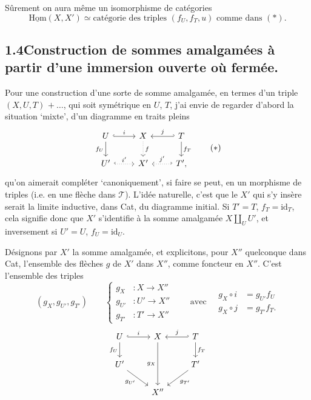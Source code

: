 \documentclass[11pt]{article}
\newcommand{\printedpage}[1]{\marginpar{\footnotesize p.~#1}}
\newcommand{\msp}[1]{\marginpar{\footnotesize [#1]}}
\newcommand{\uHom}{\underline{\mathrm{Hom}}}
\newcommand{\id}{\mathrm{id}}
\begin{document}
Sûrement on aura même un isomorphisme de catégories
\[
\uHom(X,X') \simeq \text{catégorie des triples } (f_U,f_T,u) \text{ comme dans } (*).
\]

\subsection*{1.4\quad Construction de sommes amalgamées à partir d'une immersion ouverte où fermée.} %

Pour une construction d'une sorte de somme amalgamée, en termes d'un triple $(X,U,T)$ $+\ \ldots$, \msp{page 67} qui soit symétrique en $U$, $T$, j'ai envie de regarder d'abord la situation ‘mixte’, d'un diagramme en traits pleins
\[
\begin{tikzcd}
U \arrow[r, hook, "i"] \arrow[d, "f_U"'] & X \arrow[d, dotted, "f"] & T \arrow[l, hook', "j"'] \arrow[d, "f_T"] \\
U' \arrow[r, hook, dotted, "i'"] & X' & T', \arrow[l, hook', dotted, "j'"']
\end{tikzcd}
\tag*{$(*)$}
\]
qu'on aimerait compléter ‘canoniquement’, si faire se peut, en un morphisme de triples (i.e. en une flèche dans $\mathcal{T}$). L'idée naturelle, c'est que le $X'$ qui s'y insère serait la limite inductive, dans Cat, du diagramme initial. Si $T'=T$, $f_T=\id_T$, cela signifie donc que $X'$ s'identifie à la somme amalgamée $X\amalg_U U'$, et inversement si $U'=U$, $f_U=\id_U$.

Désignons par $X'$ la somme amalgamée, et explicitons, pour $X''$ quelconque dans Cat, l'ensemble des flèches $g$ de $X'$ dans $X''$, comme foncteur en $X''$. C'est l'ensemble des triples
\[
(g_X, g_{U'}, g_{T'}) \qquad
\left\{\begin{aligned} g_X &: X \longrightarrow X'' \\ g_{U'} &: U' \longrightarrow X'' \\ g_{T'} &: T' \longrightarrow X''\end{aligned}\right.
\qquad \text{avec} \quad
\begin{aligned} g_X\circ i &= g_{U'} f_U \\ g_X \circ j &= g_{T'} f_T. \end{aligned}
\tag*{$(*)$}
\]
\printedpage{49}
\[
\begin{tikzcd}
U \arrow[r, hook, "i"] \arrow[d, "f_U"'] & X \arrow[dd, "g_X"'] & T \arrow[l, hook', "j"'] \arrow[d, "f_T"] \\
U' \arrow[dr, "g_{U'}"'] & & T' \arrow[dl, "g_{T'}"] \\
& X'' &
\end{tikzcd}
\]
\end{document}
